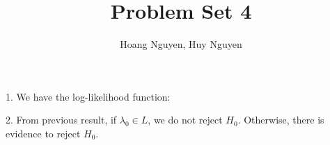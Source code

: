 \documentclass[10pt]{article}
\newenvironment{problem}[2][Problem]{\begin{trivlist}
\item[\hskip \labelsep {\bfseries #1}\hskip \labelsep {\bfseries #2.}]}{\end{trivlist}}
\begin{document}
\title{Problem Set 4}
\author{Hoang Nguyen, Huy Nguyen}
\maketitle
    
\begin{problem}{1}
\item 1.
We have the log-likelihood function: 
\[ \]


\item 2. 
From previous result, if $\lambda_0 \in L$, we do not reject $H_0$. Otherwise, there is evidence to reject $H_0$.

















\end{problem}
\end{document}

